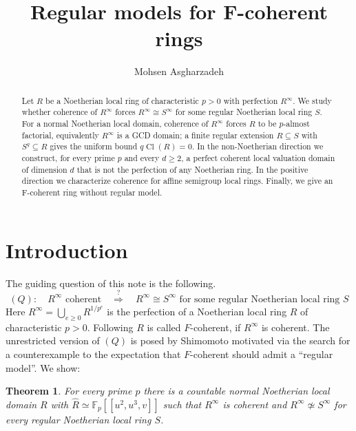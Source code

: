 \documentclass[11pt,a4paper]{amsart}
\numberwithin{equation}{section}
\newtheorem{theorem}{Theorem}[section]
\newcommand{\Cl}{\operatorname{Cl}}
\newcommand{\F}{\mathbb F}
\newcommand{\perf}{^{\infty}}
\begin{document}
	
\author[M. Asgharzadeh]{Mohsen Asgharzadeh}
\date{}


\address{M. Asgharzadeh}

 

	
	
	\title[ Regular models for F-coherent rings]
{Regular models for F-coherent rings }
	
	

 \begin{abstract}
Let $R$ be a Noetherian local ring of characteristic $p>0$ with
perfection $R^\infty$. We study   whether coherence of $R^\infty$ forces
$R^\infty\cong S^\infty$ for some regular Noetherian local ring $S$.
For a normal Noetherian local domain, coherence of $R^\infty$ forces
$R$ to be $p$-almost factorial, equivalently $R^\infty$ is a GCD
	domain; a finite regular extension $R\subseteq S$ with
$S^q\subseteq R$ gives the uniform bound $q\Cl(R)=0$.  In the
non-Noetherian direction we construct, for every prime $p$ and every
$d\geq2$, a perfect coherent local valuation domain of dimension $d$
that is not the perfection of any Noetherian ring. In the positive
direction we characterize coherence for affine semigroup local rings. Finally, we give an F-coherent ring without regular model.
\end{abstract}
 
 

	\maketitle


\section{Introduction}
\label{sec:intro}

The guiding question of this note is the following.
$$(Q):\quad
R^\infty \text{ coherent}
\quad\stackrel{?}\Longrightarrow\quad
R^\infty \cong S^\infty
\text{ for some regular Noetherian local ring } S 
$$
Here $R^\infty=\bigcup_{e\geq0}R^{1/p^e}$ is the perfection of a
Noetherian local ring $R$ of characteristic $p>0$. Following \cite{Shim}
$R$ is called $F$-coherent, if $R^\infty$ is coherent.
The unrestricted
version of $(Q)$ is posed  by  Shimomoto  motivated via the search for a
counterexample to the expectation that $F$-coherent should admit a ``regular model''. 
We show:
	\begin{theorem} 
	For every prime $p$ there is a countable normal Noetherian local
	domain $R$ with
	$\widehat R\simeq \F_p[[u^2,u^3,v]]$
	such that $R\perf$ is coherent and $R\perf\not\simeq S\perf$ for
	every regular Noetherian local ring $S$.
\end{theorem}
\end{document}
